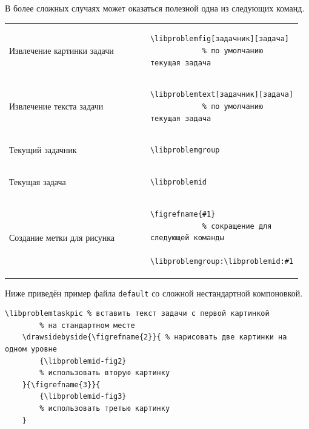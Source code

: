 \smallskip

В более сложных случаях может оказаться полезной одна из следующих команд.

\smallskip

\noindent
\begin{tabular}{S{0.48\linewidth} S{0.485\linewidth}}
    Извлечение картинки задачи &
        \begin{lstlisting}[gobble = 11]
            \libproblemfig[задачник][задача]
            % по умолчанию текущая задача
        \end{lstlisting} \\
    Извлечение текста задачи &
        \begin{lstlisting}[gobble = 11]
            \libproblemtext[задачник][задача]
            % по умолчанию текущая задача
        \end{lstlisting} \\
    Текущий задачник &
        \begin{lstlisting}[gobble = 11]
            \libproblemgroup
        \end{lstlisting} \\
    Текущая задача &
        \begin{lstlisting}[gobble = 11]
            \libproblemid
        \end{lstlisting} \\
    Создание метки для рисунка &
        \begin{lstlisting}[gobble = 11]
            \figrefname{#1}
            % сокращение для следующей команды
            \libproblemgroup:\libproblemid:#1
        \end{lstlisting} \\
\end{tabular}

Ниже приведён пример файла \texttt{default} со сложной нестандартной компоновкой.

\begin{lstlisting}[gobble = 3]
    \libproblemtaskpic % вставить текст задачи с первой картинкой
        % на стандартном месте
    \drawsidebyside{\figrefname{2}}{ % нарисовать две картинки на одном уровне
        {\libproblemid-fig2}
        % использовать вторую картинку
    }{\figrefname{3}}{
        {\libproblemid-fig3}
        % использовать третью картинку
    }
\end{lstlisting}
